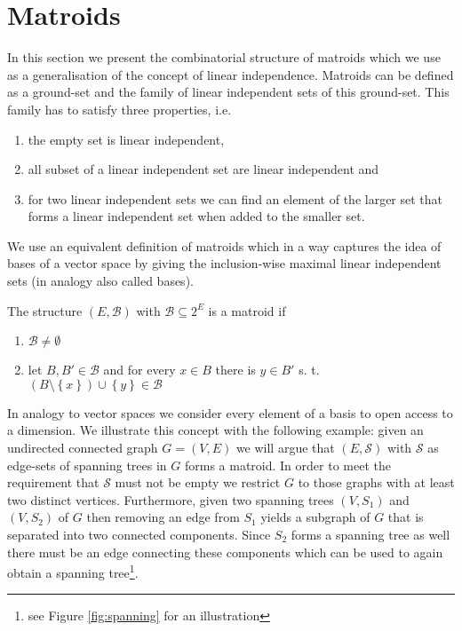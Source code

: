 \documentclass{scrartcl}
\theoremstyle{nonumberplain}
\newcommand{\tupel}[1]{\left(#1\right)}
\newcommand{\set}[1]{\left\{#1\right\}}
\begin{document}
\section{Matroids}
In this section we present the combinatorial structure of matroids
which we use as a generalisation of the concept of linear independence.
Matroids can be defined as a ground-set and the family of linear
independent sets of this ground-set. This family has to satisfy three
properties, i.e.
\begin{enumerate}
  \item the empty set is linear independent,
  \item all subset of a linear independent set are linear independent and
  \item for two linear independent sets we can find an element of the larger
    set that forms a linear independent set when added to the smaller set.
\end{enumerate}
We use an equivalent definition of matroids which in a way captures the idea of
bases of a vector space by giving the inclusion-wise maximal linear independent
sets (in analogy also called bases).
\begin{defi}
  The structure $\tupel{E, \mathcal{B}}$ with $\mathcal{B}\subseteq 2^{E}$ is
  a matroid if
  \begin{enumerate}
    \item $\mathcal{B}\neq\emptyset$
    \item let $B,B'\in\mathcal{B}$ and for every $x\in B$ there is $y\in B'$
      s. t. $(B\setminus\set{x})\cup\set{y}\in\mathcal{B}$
  \end{enumerate}
\end{defi}
In analogy to vector spaces we consider every element of a basis to open access
to a dimension. We illustrate this concept with the following example: given an
undirected connected graph $G = \tupel{V, E}$ we will argue that
$\tupel{E, \mathcal{S}}$ with $\mathcal{S}$ as edge-sets of spanning trees
in $G$ forms a matroid. In order to meet the requirement that $\mathcal{S}$
must not be empty we restrict $G$ to those graphs with at least two distinct
vertices. Furthermore, given two spanning trees $\tupel{V, S_{1}}$ and
$\tupel{V, S_{2}}$ of $G$ then removing an edge from $S_{1}$ yields a subgraph
of $G$ that is separated into two connected components. Since $S_{2}$ forms a
spanning tree as well there must be an edge connecting these components which
can be used to again obtain a spanning tree\footnote{see Figure
\ref{fig:spanning} for an illustration}.
\end{document}
